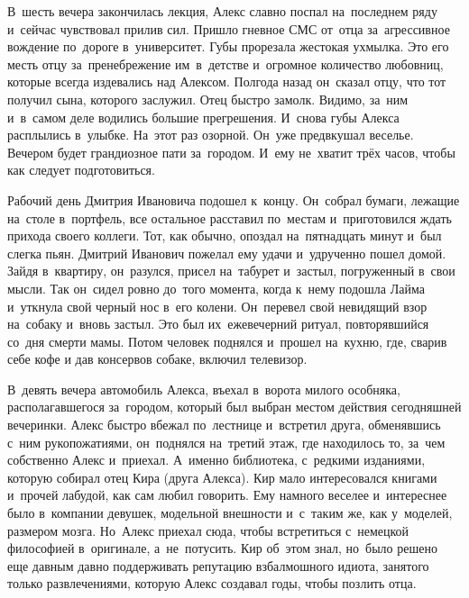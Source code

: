 В~шесть вечера закончилась лекция, Алекс славно поспал на~последнем ряду и~сейчас чувствовал прилив сил.
Пришло гневное СМС от~отца за~агрессивное вождение по~дороге в~университет.
Губы прорезала жестокая ухмылка.
Это его месть отцу за~пренебрежение им~в~детстве и~огромное количество любовниц, которые всегда издевались над Алексом.
Полгода назад он~сказал отцу, что тот получил сына, которого заслужил.
Отец быстро замолк.
Видимо, за~ним и~в~самом деле водились большие прегрешения.
И~снова губы Алекса расплылись в~улыбке.
На~этот раз озорной.
Он~уже предвкушал веселье.
Вечером будет грандиозное пати за~городом.
И~ему не~хватит трёх часов, чтобы как следует подготовиться.

\vspace{1cm}

Рабочий день Дмитрия Ивановича подошел к~концу.
Он~собрал бумаги, лежащие на~столе в~портфель, все остальное расставил по~местам и~приготовился ждать прихода своего коллеги.
Тот, как обычно, опоздал на~пятнадцать минут и~был слегка пьян.
Дмитрий Иванович пожелал ему удачи и~удрученно пошел домой.
Зайдя в~квартиру, он~разулся, присел на~табурет и~застыл, погруженный в~свои мысли.
Так он~сидел ровно до~того момента, когда к~нему подошла Лайма и~уткнула свой черный нос в~его колени.
Он~перевел свой невидящий взор на~собаку и~вновь застыл.
Это был их~ежевечерний ритуал, повторявшийся со~дня смерти мамы.
Потом человек поднялся и~прошел на~кухню, где, сварив себе кофе и дав консервов собаке, включил телевизор.

\vspace{1cm}

В~девять вечера автомобиль Алекса, въехал в~ворота милого особняка, располагавшегося за~городом, который был выбран местом действия сегодняшней вечеринки.
Алекс быстро вбежал по~лестнице и~встретил друга, обменявшись с~ним рукопожатиями, он~поднялся на~третий этаж, где находилось то, за~чем собственно Алекс и~приехал.
А~именно библиотека, с~редкими изданиями, которую собирал отец Кира (друга Алекса).
Кир мало интересовался книгами и~прочей лабудой, как сам любил говорить.
Ему намного веселее и~интереснее было в~компании девушек, модельной внешности и~с~таким же, как у~моделей, размером мозга.
Но~Алекс приехал сюда, чтобы встретиться с~немецкой философией в~оригинале, а~не~потусить.
Кир об~этом знал, но~было решено еще давным давно поддерживать репутацию взбалмошного идиота, занятого только развлечениями, которую Алекс создавал годы, чтобы позлить отца.

\vspace{1cm}

